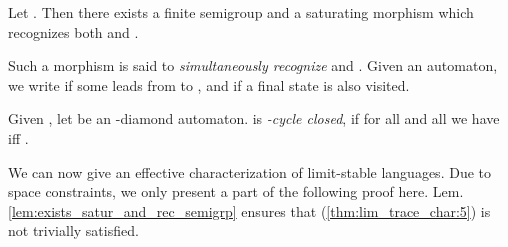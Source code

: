 \begin{lemma}
\label{lem:exists_satur_and_rec_semigrp}
Let . Then there exists a finite semigroup  and a saturating morphism  which recognizes both  and . 
\end{lemma}
Such a morphism is said to \emph{simultaneously recognize}  and . Given an automaton, we write  if some  leads from  to , and  if a final state is also visited.

\begin{definition}
Given , let   be an -diamond automaton.  is \emph{-cycle closed}, if for all  and all  we have  iff .
\end{definition}

We can now give an effective characterization of limit-stable languages. Due to space constraints, we only present a part of the following proof here. Lem. \ref{lem:exists_satur_and_rec_semigrp} ensures that (\ref{thm:lim_trace_char:5}) is not trivially satisfied.

